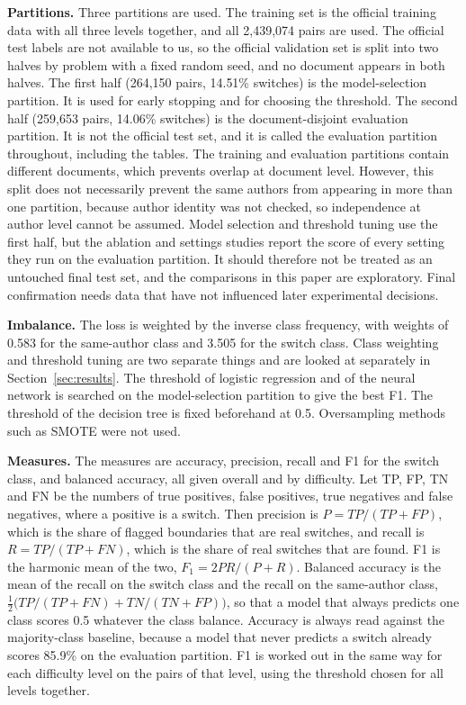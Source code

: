 \documentclass[runningheads]{llncs}
\begin{document}
\textbf{Partitions.} Three partitions are used. The training set is the official training data with all three levels together, and all 2,439,074 pairs are used. The official test labels are not available to us, so the official validation set is split into two halves by problem with a fixed random seed, and no document appears in both halves. The first half (264,150 pairs, 14.51\% switches) is the model-selection partition. It is used for early stopping and for choosing the threshold. The second half (259,653 pairs, 14.06\% switches) is the document-disjoint evaluation partition. It is not the official test set, and it is called the evaluation partition throughout, including the tables. The training and evaluation partitions contain different documents, which prevents overlap at document level. However, this split does not necessarily prevent the same authors from appearing in more than one partition, because author identity was not checked, so independence at author level cannot be assumed. Model selection and threshold tuning use the first half, but the ablation and settings studies report the score of every setting they run on the evaluation partition. It should therefore not be treated as an untouched final test set, and the comparisons in this paper are exploratory. Final confirmation needs data that have not influenced later experimental decisions.

\textbf{Imbalance.} The loss is weighted by the inverse class frequency, with weights of 0.583 for the same-author class and 3.505 for the switch class. Class weighting and threshold tuning are two separate things and are looked at separately in Section~\ref{sec:results}. The threshold of logistic regression and of the neural network is searched on the model-selection partition to give the best F1. The threshold of the decision tree is fixed beforehand at 0.5. Oversampling methods such as SMOTE \cite{chawla2002smote} were not used.

\textbf{Measures.} The measures are accuracy, precision, recall and F1 for the switch class, and balanced accuracy, all given overall and by difficulty. Let TP, FP, TN and FN be the numbers of true positives, false positives, true negatives and false negatives, where a positive is a switch. Then precision is $P = TP/(TP+FP)$, which is the share of flagged boundaries that are real switches, and recall is $R = TP/(TP+FN)$, which is the share of real switches that are found. F1 is the harmonic mean of the two, $F_1 = 2PR/(P+R)$. Balanced accuracy is the mean of the recall on the switch class and the recall on the same-author class, $\tfrac{1}{2}\big(TP/(TP+FN) + TN/(TN+FP)\big)$, so that a model that always predicts one class scores 0.5 whatever the class balance. Accuracy is always read against the majority-class baseline, because a model that never predicts a switch already scores 85.9\% on the evaluation partition. F1 is worked out in the same way for each difficulty level on the pairs of that level, using the threshold chosen for all levels together.
\end{document}
